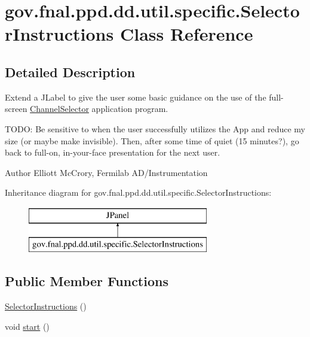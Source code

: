 \hypertarget{classgov_1_1fnal_1_1ppd_1_1dd_1_1util_1_1specific_1_1SelectorInstructions}{\section{gov.\-fnal.\-ppd.\-dd.\-util.\-specific.\-Selector\-Instructions Class Reference}
\label{classgov_1_1fnal_1_1ppd_1_1dd_1_1util_1_1specific_1_1SelectorInstructions}
}


\subsection{Detailed Description}
Extend a J\-Label to give the user some basic guidance on the use of the full-\/screen \hyperlink{classgov_1_1fnal_1_1ppd_1_1dd_1_1ChannelSelector}{Channel\-Selector} application program.

T\-O\-D\-O\-: Be sensitive to when the user successfully utilizes the App and reduce my size (or maybe make invisible). Then, after some time of quiet (15 minutes?), go back to full-\/on, in-\/your-\/face presentation for the next user.

\begin{DoxyAuthor}{Author}
Elliott Mc\-Crory, Fermilab A\-D/\-Instrumentation 
\end{DoxyAuthor}
Inheritance diagram for gov.\-fnal.\-ppd.\-dd.\-util.\-specific.\-Selector\-Instructions\-:\begin{figure}[H]
\begin{center}
\leavevmode
\includegraphics[height=2.000000cm]{classgov_1_1fnal_1_1ppd_1_1dd_1_1util_1_1specific_1_1SelectorInstructions}
\end{center}
\end{figure}
\subsection*{Public Member Functions}
\begin{DoxyCompactItemize}
\item 
\hyperlink{classgov_1_1fnal_1_1ppd_1_1dd_1_1util_1_1specific_1_1SelectorInstructions_a47e9f61f9d6edf54d0ac63288fe53a2b}{Selector\-Instructions} ()
\item 
void \hyperlink{classgov_1_1fnal_1_1ppd_1_1dd_1_1util_1_1specific_1_1SelectorInstructions_acc5173794b299a9e4f9062cead781bad}{start} ()
\end{DoxyCompactItemize}
